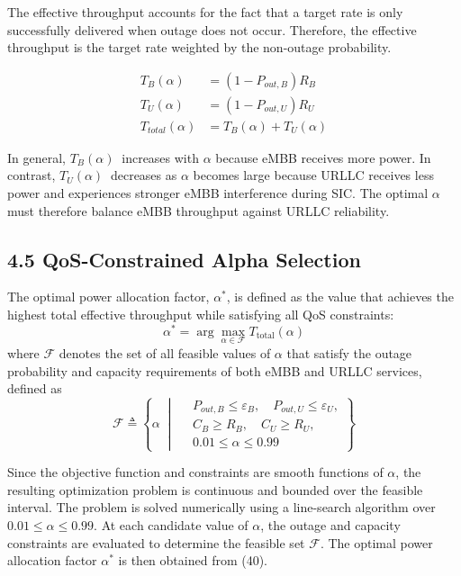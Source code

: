 \documentclass[
]{article}
\begin{document}
The effective throughput accounts for the fact that a target rate is
only successfully delivered when outage does not occur. Therefore, the
effective throughput is the target rate weighted by the non-outage
probability.

\begin{align}
T_{B}(\alpha) &= (1 - P_{out,B}) R_{B} \\[1ex]
T_{U}(\alpha) &= (1 - P_{out,U}) R_{U} \\[1ex]
T_{total}(\alpha) &= T_{B}(\alpha) + T_{U}(\alpha)
\end{align}

In general, \(T_{B}(\alpha)\ \) increases with \(α\) because eMBB receives
more power. In contrast, \(T_{U}(\alpha)\ \) decreases as \(α\) becomes
large because URLLC receives less power and experiences stronger eMBB
interference during SIC. The optimal \(α\) must therefore balance eMBB
throughput against URLLC reliability.

\subsection{4.5 QoS-Constrained Alpha
Selection}\label{qos-constrained-alpha-selection}

The optimal power allocation factor, $\alpha^{*}$, is defined as the value
that achieves the highest total effective throughput while satisfying
all QoS constraints:
\begin{equation}
\alpha^{*} = \arg\max_{\alpha \in \mathcal{F}} T_{\text{total}}(\alpha)
\label{eq:alpha_star}
\end{equation}
where $\mathcal{F}$ denotes the set of all feasible values of $\alpha$
that satisfy the outage probability and capacity requirements of both
eMBB and URLLC services, defined as
\begin{equation}
\mathcal{F} \triangleq \left\{ \alpha \;\middle|\;
\begin{aligned}
& P_{out,B} \le \varepsilon_B, \quad P_{out,U} \le \varepsilon_U, \\
& C_B \ge R_B, \quad C_U \ge R_U, \\
& 0.01 \le \alpha \le 0.99
\end{aligned}
\right\}
\label{eq:feasible_set}
\end{equation}

Since the objective function and constraints are smooth functions of $\alpha$, the resulting optimization problem is continuous and bounded over the feasible interval. The problem is solved numerically using a line-search algorithm over $0.01 \leq \alpha \leq 0.99$. At each candidate value of $\alpha$, the outage and capacity constraints are evaluated to determine the feasible set $\mathcal{F}$. The optimal power allocation factor $\alpha^{*}$ is then obtained from (40).
\end{document}
